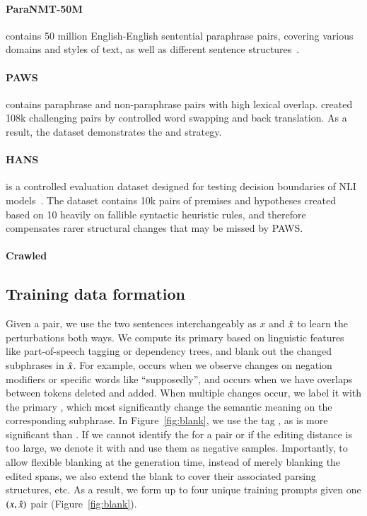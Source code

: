 \paragraph{ParaNMT-50M} contains 50 million English-English sentential paraphrase pairs, covering various domains and styles of text, as well as different sentence structures~\citet{wieting2017paranmt}. 

\paragraph{PAWS} contains paraphrase and non-paraphrase pairs with high lexical overlap. 
\citet{zhang2019paws} created 108k challenging pairs by controlled word swapping and back translation.
As a result, the dataset demonstrates the  and  strategy.


\paragraph{HANS} is a controlled evaluation dataset designed for testing decision boundaries of NLI models~\cite{mccoy2019right}. 
The dataset contains 10k pairs of premises and hypotheses created based on 10 heavily on fallible syntactic heuristic rules, and therefore compensates rarer structural changes that may be missed by PAWS.


\paragraph{Crawled} 



\subsection{Training data formation}

Given a pair, we use the two sentences interchangeably as $x$ and $\hat{x}$ to learn the perturbations both ways.
We compute its primary \tagstr based on linguistic features like part-of-speech tagging or dependency trees, and blank out the changed subphrases in $\hat{x}$.
For example,  occurs when we observe changes on negation modifiers or specific words like ``supposedly'', and  occurs when we have overlaps between tokens deleted and added.
When multiple changes occur, we label it with the primary \tagstr, which most significantly change the semantic meaning on the corresponding subphrase.
In Figure~\ref{fig:blank}, we use the tag , as  is more significant than .
If we cannot identify the \tagstr for a pair or if the editing distance is too large, we denote it with \ctrltag{[global]} and use them as negative samples.
Importantly, to allow flexible blanking at the generation time, instead of merely blanking the edited spans, we also extend the blank to cover their associated parsing structures, etc.
As a result, we form up to four unique training prompts given one $(x, \hat{x})$ pair (Figure~\ref{fig:blank}).

